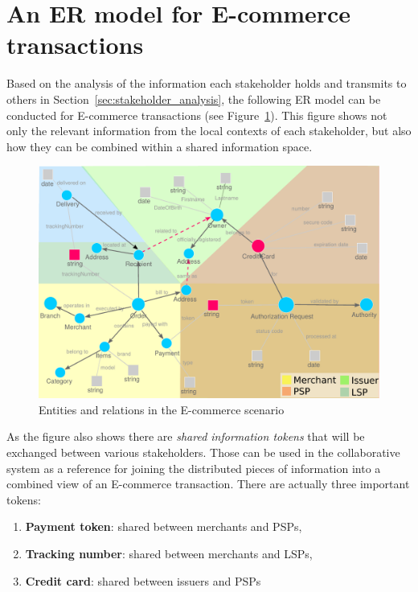
\section{An \gls{ER} model for \gls{E-commerce} transactions}
\label{sec:data_model_transactions}

Based on the analysis of the information each stakeholder holds and transmits to others in Section~\ref{sec:stakeholder_analysis}, the following \gls{ER} model can be conducted for \gls{E-commerce} transactions (see Figure~\ref{fig:images_data_model}). This figure shows not only the relevant information from the local contexts of each stakeholder, but also how they can be combined within a shared information space. \\

\begin{figure}[!ht]
  \centering
  \includegraphics[width=0.9\columnwidth]{images/ontology_scenario_1.pdf}
  \caption[Entities and relations in the \gls{E-commerce} scenario]{Entities and relations in the \gls{E-commerce} scenario}
\label{fig:images_data_model}
\end{figure}

As the figure also shows there are \emph{shared information tokens} that will be exchanged between various stakeholders. Those can be used in the collaborative system as a reference for joining the distributed pieces of information into a combined view of an \gls{E-commerce} transaction. There are actually three important tokens: \@

\begin{enumerate}
  \item \textbf{Payment token}: shared between merchants and \gls{PSP}s,
  \item \textbf{Tracking number}: shared between merchants and \gls{LSP}s,
  \item \textbf{Credit card}: shared between issuers and \gls{PSP}s
\end{enumerate}

